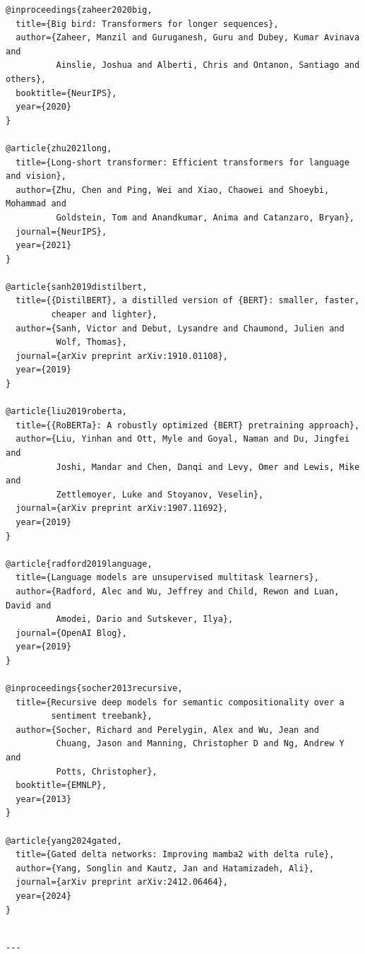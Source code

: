 \begin{lstlisting}
@inproceedings{zaheer2020big,
  title={Big bird: Transformers for longer sequences},
  author={Zaheer, Manzil and Guruganesh, Guru and Dubey, Kumar Avinava and 
          Ainslie, Joshua and Alberti, Chris and Ontanon, Santiago and others},
  booktitle={NeurIPS},
  year={2020}
}

@article{zhu2021long,
  title={Long-short transformer: Efficient transformers for language and vision},
  author={Zhu, Chen and Ping, Wei and Xiao, Chaowei and Shoeybi, Mohammad and 
          Goldstein, Tom and Anandkumar, Anima and Catanzaro, Bryan},
  journal={NeurIPS},
  year={2021}
}

@article{sanh2019distilbert,
  title={{DistilBERT}, a distilled version of {BERT}: smaller, faster, 
         cheaper and lighter},
  author={Sanh, Victor and Debut, Lysandre and Chaumond, Julien and 
          Wolf, Thomas},
  journal={arXiv preprint arXiv:1910.01108},
  year={2019}
}

@article{liu2019roberta,
  title={{RoBERTa}: A robustly optimized {BERT} pretraining approach},
  author={Liu, Yinhan and Ott, Myle and Goyal, Naman and Du, Jingfei and 
          Joshi, Mandar and Chen, Danqi and Levy, Omer and Lewis, Mike and 
          Zettlemoyer, Luke and Stoyanov, Veselin},
  journal={arXiv preprint arXiv:1907.11692},
  year={2019}
}

@article{radford2019language,
  title={Language models are unsupervised multitask learners},
  author={Radford, Alec and Wu, Jeffrey and Child, Rewon and Luan, David and 
          Amodei, Dario and Sutskever, Ilya},
  journal={OpenAI Blog},
  year={2019}
}

@inproceedings{socher2013recursive,
  title={Recursive deep models for semantic compositionality over a 
         sentiment treebank},
  author={Socher, Richard and Perelygin, Alex and Wu, Jean and 
          Chuang, Jason and Manning, Christopher D and Ng, Andrew Y and 
          Potts, Christopher},
  booktitle={EMNLP},
  year={2013}
}

@article{yang2024gated,
  title={Gated delta networks: Improving mamba2 with delta rule},
  author={Yang, Songlin and Kautz, Jan and Hatamizadeh, Ali},
  journal={arXiv preprint arXiv:2412.06464},
  year={2024}
}
\end{lstlisting}
\begin{lstlisting}

---
\end{lstlisting}
